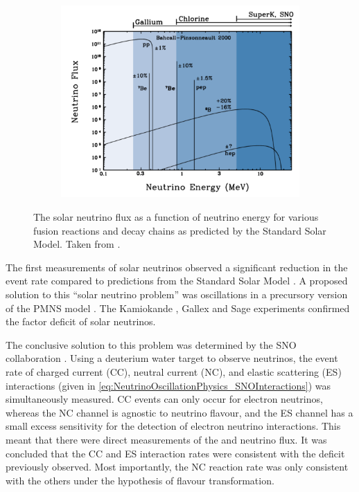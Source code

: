 \begin{figure}[h]
  \begin{subfigure}[t]{0.80\textwidth}
    \includegraphics[width=\textwidth, trim={0mm 0mm 0mm 0mm}, clip,page=1]{Figures/Theory/SolarNeutrinoFlux.pdf}
  \end{subfigure}
  \caption{The solar neutrino flux as a function of neutrino energy for various fusion reactions and decay chains as predicted by the Standard Solar Model. Taken from \cite{Bellerive2004-ur}.}
  \label{fig:NeutrinoOscillationPhysics_SolarNeutrinoFlux}
\end{figure}

The first measurements of solar neutrinos observed a significant reduction in the event rate compared to predictions from the Standard Solar Model \cite{PhysRevLett.20.1205, Vinyoles2017-vv}. A proposed solution to this ``solar neutrino problem'' was  oscillations in a precursory version of the PMNS model \cite{Gribov1969-xi}. The Kamiokande \cite{PhysRevLett.63.16}, Gallex \cite{Hampel1999-of} and Sage \cite{PhysRevC.60.055801} experiments confirmed the  factor deficit of solar neutrinos.

The conclusive solution to this problem was determined by the SNO collaboration \cite{PhysRevLett.89.011301}. Using a deuterium water target to observe  neutrinos, the event rate of charged current (CC), neutral current (NC), and elastic scattering (ES) interactions (given in \autoref{eq:NeutrinoOscillationPhysics_SNOInteractions}) was simultaneously measured. CC events can only occur for electron neutrinos, whereas the NC channel is agnostic to neutrino flavour, and the ES channel has a small excess sensitivity for the detection of electron neutrino interactions. This meant that there were direct measurements of the  and  neutrino flux. It was concluded that the CC and ES interaction rates were consistent with the deficit previously observed. Most importantly, the NC reaction rate was only consistent with the others under the hypothesis of flavour transformation.

